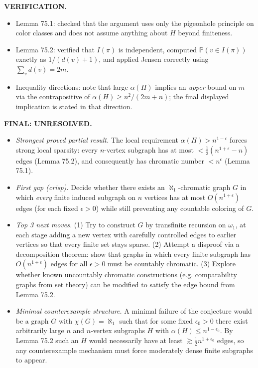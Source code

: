 \medskip
\noindent\textbf{VERIFICATION.}
\begin{itemize}
\item Lemma 75.1: checked that the argument uses only the pigeonhole principle on color classes and does not assume anything about $H$ beyond finiteness.
\item Lemma 75.2: verified that $I(\pi)$ is independent, computed $\mathbb P(v\in I(\pi))$ exactly as $1/(d(v)+1)$, and applied Jensen correctly using $\sum_v d(v)=2m$.
\item Inequality directions: note that large $\alpha(H)$ implies an \emph{upper} bound on $m$ via the contrapositive of $\alpha(H)\ge n^2/(2m+n)$; the final displayed implication is stated in that direction.
\end{itemize}

\medskip
\noindent\textbf{FINAL: \textbf{UNRESOLVED}.}
\begin{itemize}
\item[(i)] \emph{Strongest proved partial result.} The local requirement $\alpha(H)>n^{1-\epsilon}$ forces strong local sparsity: every $n$-vertex subgraph has at most $<\frac12(n^{1+\epsilon}-n)$ edges (Lemma 75.2), and consequently has chromatic number $<n^{\epsilon}$ (Lemma 75.1).
\item[(ii)] \emph{First gap (crisp).} Decide whether there exists an $\aleph_1$-chromatic graph $G$ in which \emph{every} finite induced subgraph on $n$ vertices has at most $O(n^{1+\epsilon})$ edges (for each fixed $\epsilon>0$) while still preventing any countable coloring of $G$.
\item[(iii)] \emph{Top 3 next moves.}
(1) Try to construct $G$ by transfinite recursion on $\omega_1$, at each stage adding a new vertex with carefully controlled edges to earlier vertices so that every finite set stays sparse.
(2) Attempt a disproof via a decomposition theorem: show that graphs in which every finite subgraph has $O(n^{1+\epsilon})$ edges for all $\epsilon>0$ must be countably chromatic.
(3) Explore whether known uncountably chromatic constructions (e.g. comparability graphs from set theory) can be modified to satisfy the edge bound from Lemma 75.2.
\item[(iv)] \emph{Minimal counterexample structure.} A minimal failure of the conjecture would be a graph $G$ with $\chi(G)=\aleph_1$ such that for some fixed $\epsilon_0>0$ there exist arbitrarily large $n$ and $n$-vertex subgraphs $H$ with $\alpha(H)\le n^{1-\epsilon_0}$. By Lemma 75.2 such an $H$ would necessarily have at least $\gtrsim \tfrac12 n^{1+\epsilon_0}$ edges, so any counterexample mechanism must force moderately dense finite subgraphs to appear.
\end{itemize}

